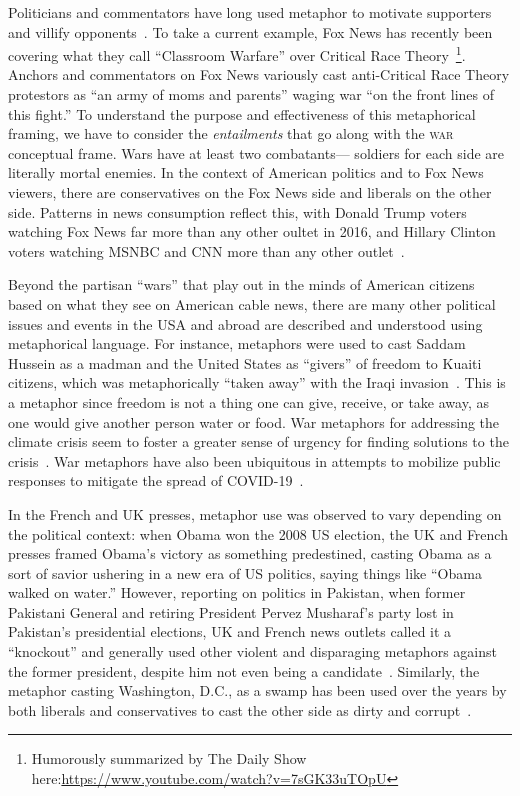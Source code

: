 Politicians and commentators have long used metaphor to motivate
supporters and villify opponents~\cite{Charteris-Black2009}. 
To take a current example, Fox News has
recently been covering what they call ``Classroom Warfare'' over
Critical Race Theory~\footnote{Humorously summarized by The Daily Show here:\url{https://www.youtube.com/watch?v=7sGK33uTOpU}}.
Anchors and commentators on Fox News variously cast anti-Critical Race Theory
protestors as ``an army of moms and parents'' waging war ``on the front lines
of this fight.'' To understand the purpose and effectiveness of this metaphorical framing, 
we have to consider the \emph{entailments} that go
along with the \textsc{war} conceptual frame. Wars have at least two combatants---
soldiers for each side are literally mortal enemies. 
In the context of American politics and to Fox News viewers, there
are conservatives on the Fox News side and liberals on the other side. 
Patterns in news consumption reflect this, with Donald Trump
voters watching Fox News far more than any other oultet in 2016, and 
Hillary Clinton voters watching MSNBC and CNN more than any other 
outlet~\cite{Prior2013,Pew2014PolarizationAndMediaHabits,Pew2017TrumpClinton}.

Beyond the partisan ``wars'' that play out in the minds of American citizens
based on what they see on American cable news, there are many
other political issues and events in the USA and abroad are 
described and understood using metaphorical language. For instance, metaphors were
used to cast Saddam Hussein as a madman and the United States as ``givers''
of freedom to Kuaiti citizens, which was metaphorically ``taken away''
with the Iraqi invasion~\cite{Lakoff1991}. 
This is a metaphor since freedom
is not a thing one can give, receive, or take away, 
as one would give another person water or food.
War metaphors for addressing the climate crisis seem to foster a greater
sense of urgency for finding solutions to the crisis~\cite{Flusberg2018}. 
War metaphors have also been ubiquitous in attempts to mobilize public 
responses to mitigate the spread of COVID-19~\cite{CastroSeixas2021}.

In the French and UK presses, metaphor use was observed to vary depending on the
political context: when Obama won the 2008 US election,
the UK and French presses framed Obama's victory as something predestined,
casting Obama as a sort of savior ushering in a new era of US politics, 
saying things like ``Obama walked on water.'' However, reporting on politics in Pakistan,
when former Pakistani General and retiring President Pervez Musharaf's party 
lost in Pakistan's presidential elections, UK and French news outlets 
called it a ``knockout'' and generally used other violent and disparaging
metaphors against the former president, despite him not even being a 
candidate~\cite{Burnes2011}. Similarly, the metaphor casting Washington, D.C.,
as a swamp has been used over the years
by both liberals and conservatives to cast the other side 
as dirty and corrupt~\cite{Burgers2019}.

